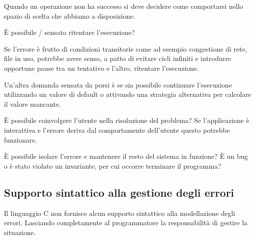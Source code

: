 Quando un operazione non ha successo si deve decidere come comportarsi nello
spazio di scelta che abbiamo a disposizione.

È possibile / sensato ritentare l'esecuzione?

Se l'errore è frutto di condizioni transitorie come ad esempio congestione di
rete, file in uso, potrebbe avere senso, a patto di evitare cicli infiniti e
introdurre opportune pause tra un tentativo e l'altro, ritentare l'esecuzione.


Un'altra domanda sensata da porsi è se sia possibile continuare l'esecuzione
utilizzando un valore di default o attivando una strategia alternativa per
calcolare il valore mancante.


È possibile coinvolgere l'utente nella risoluzione del problema? Se l'applicazione
è interattiva  e l'errore deriva dal comportamente dell'utente questo potrebbe
funzionare.

È possibile isolare l'errore e mantenere il resto del sistema in funzione?
È un bug o è stato violato un invariante, per cui occorre terminare il programma?








\subsection{Supporto sintattico alla gestione degli errori}

Il linguaggio C non fornisce alcun supporto sintattico alla modellazione degli
errori. Lasciando completamente al programmatore la responsabilità di gestire la
situazione.\newline

